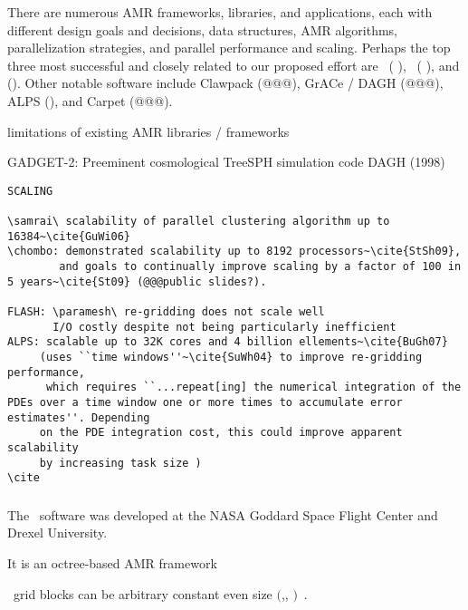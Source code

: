 \documentclass[10pt]{article}
\begin{document}
There are numerous AMR frameworks, libraries, and applications, each
with different design goals and decisions, data structures, AMR
algorithms, parallelization strategies, and parallel performance and
scaling.  Perhaps the top three most successful and closely related to
our proposed effort are \paramesh\ (\cite{MaOl00} \nocite{OlMa05}
\nocite{Ol06}), \chombo\  (\cite{wwwchombo} \cite{CoGr09}), and \samrai
(\cite{@@@}).  Other notable software include Clawpack (@@@), GrACe / DAGH
(@@@), ALPS (\cite{BuBu09}), and Carpet (@@@).

limitations of existing AMR libraries / frameworks

GADGET-2: Preeminent cosmological TreeSPH simulation code
DAGH (1998)

\begin{verbatim}
SCALING

\samrai\ scalability of parallel clustering algorithm up to 16384~\cite{GuWi06}
\chombo: demonstrated scalability up to 8192 processors~\cite{StSh09},
        and goals to continually improve scaling by a factor of 100 in 5 years~\cite{St09} (@@@public slides?).
  
FLASH: \paramesh\ re-gridding does not scale well
       I/O costly despite not being particularly inefficient
ALPS: scalable up to 32K cores and 4 billion ellements~\cite{BuGh07}
     (uses ``time windows''~\cite{SuWh04} to improve re-gridding performance,
      which requires ``...repeat[ing] the numerical integration of the PDEs over a time window one or more times to accumulate error estimates''. Depending
     on the PDE integration cost, this could improve apparent scalability
     by increasing task size )
\cite
\end{verbatim}

\subsubsection{\paramesh} \label{sss:paramesh}

\nocite{wwwparamesh}
\nocite{MaOl00} %
\nocite{OlMa05}
\nocite{Ol06}

The \paramesh\ software was developed at the NASA Goddard Space Flight
Center and Drexel University.

It is an octree-based AMR framework

\paramesh\ grid blocks can be arbitrary constant even size $($,, $)$~\cite{wwwparamesh}.
\end{document}
